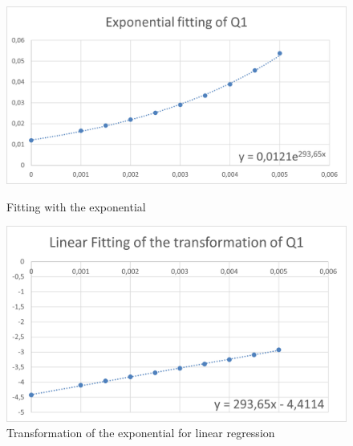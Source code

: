 \documentclass{article}
\begin{document}
                    \begin{figure}[htbp!]
                        \centering
                        \begin{minipage}[c]{.40\textwidth}
                            \centering
                            \includegraphics[width=\textwidth]{./data_analysis/Q1_exp_delta.png}
                            \caption{Fitting with the exponential}
                            \label{fig:Q1_exp_delta}
                        \end{minipage}
                        \hspace{10mm}
                        \begin{minipage}[c]{.40\textwidth}
                            \centering
                            \includegraphics[width=\textwidth]{./data_analysis/Q1_lin_delta.png}
                            \caption{Transformation of the exponential for linear regression}
                            \label{fig:Q1_lin_delta}
                        \end{minipage}
                    \end{figure}
                    
\end{document}
